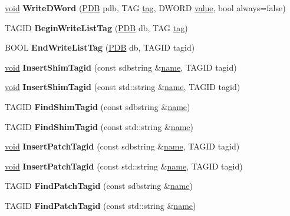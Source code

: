 \begin{DoxyCompactItemize}
\item 
\mbox{\label{struct_database_a2dce0fedbf0662a6ab3e5637a54922f9}} 
\hyperlink{interfacevoid}{void} {\bfseries Write\+D\+Word} (\hyperlink{struct___d_b}{P\+DB} pdb, T\+AG \hyperlink{structtag}{tag}, D\+W\+O\+RD \hyperlink{unionvalue}{value}, bool always=false)
\item 
\mbox{\label{struct_database_ad89b78f9844dbde9a9d1a2fd1ceaf1ae}} 
T\+A\+G\+ID {\bfseries Begin\+Write\+List\+Tag} (\hyperlink{struct___d_b}{P\+DB} db, T\+AG \hyperlink{structtag}{tag})
\item 
\mbox{\label{struct_database_ad68d3a4accd7797ab999608b7824955d}} 
B\+O\+OL {\bfseries End\+Write\+List\+Tag} (\hyperlink{struct___d_b}{P\+DB} db, T\+A\+G\+ID tagid)
\item 
\mbox{\label{struct_database_a05f5dd11e652e427a0025cec46b72f9f}} 
\hyperlink{interfacevoid}{void} {\bfseries Insert\+Shim\+Tagid} (const sdbstring \&\hyperlink{structname}{name}, T\+A\+G\+ID tagid)
\item 
\mbox{\label{struct_database_a56f1021298145cbc54981ef729803ca1}} 
\hyperlink{interfacevoid}{void} {\bfseries Insert\+Shim\+Tagid} (const std\+::string \&\hyperlink{structname}{name}, T\+A\+G\+ID tagid)
\item 
\mbox{\label{struct_database_a11a51c1a494a9cf78340abfb7a310def}} 
T\+A\+G\+ID {\bfseries Find\+Shim\+Tagid} (const sdbstring \&\hyperlink{structname}{name})
\item 
\mbox{\label{struct_database_a19a1acae4973ecc7667ad59f0162235a}} 
T\+A\+G\+ID {\bfseries Find\+Shim\+Tagid} (const std\+::string \&\hyperlink{structname}{name})
\item 
\mbox{\label{struct_database_aaff7f562b07130efe3c9a727e136a4d2}} 
\hyperlink{interfacevoid}{void} {\bfseries Insert\+Patch\+Tagid} (const sdbstring \&\hyperlink{structname}{name}, T\+A\+G\+ID tagid)
\item 
\mbox{\label{struct_database_a005076e7b24c4ea9a8e7b65957cc6931}} 
\hyperlink{interfacevoid}{void} {\bfseries Insert\+Patch\+Tagid} (const std\+::string \&\hyperlink{structname}{name}, T\+A\+G\+ID tagid)
\item 
\mbox{\label{struct_database_a48eef628fb5c8011f64de0d611c595e1}} 
T\+A\+G\+ID {\bfseries Find\+Patch\+Tagid} (const sdbstring \&\hyperlink{structname}{name})
\item 
\mbox{\label{struct_database_a84c00d47cc71fbfdafa6c771307e45f8}} 
T\+A\+G\+ID {\bfseries Find\+Patch\+Tagid} (const std\+::string \&\hyperlink{structname}{name})
\end{DoxyCompactItemize}
